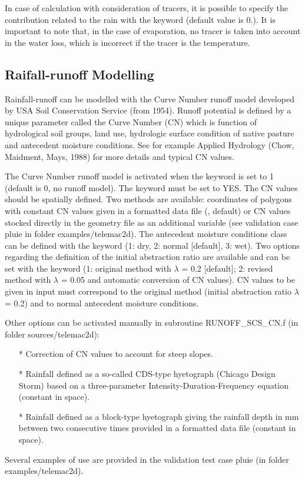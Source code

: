  In case of calculation with consideration of tracers, it is possible to specify the contribution related to the rain with the keyword  (default value is 0.). It is important to note that, in the case of evaporation, no tracer is taken into account in the water loss, which is incorrect if the tracer is the temperature.

\subsection{Raifall-runoff Modelling}

Rainfall-runoff can be modelled with the Curve Number runoff model developed by USA Soil Conservation Service (from 1954). Runoff potential is defined by a unique parameter called the Curve Number (CN) which is function of hydrological soil groups, land use, hydrologic surface condition of native pasture and antecedent moisture conditions. See for example Applied Hydrology (Chow, Maidment, Mays, 1988) for more details and typical CN values. 

The Curve Number runoff model is activated when the keyword  is set to 1 (default is 0, no runoff model). The keyword  
must be set to YES. The CN values should be spatially defined. Two methods are available: coordinates of polygons with constant CN values given in a formatted data file (, default) or CN values stocked directly in the geometry file as an additional variable (see validation case pluie in folder examples/telemac2d). The antecedent moisture conditions class can be defined with the keyword  (1: dry, 2: normal [default], 3: wet). Two options regarding the definition of the initial abstraction ratio are available and can be set with the keyword  (1: original method with $\lambda$ = 0.2 [default]; 2: revised method with $\lambda$ = 0.05 and automatic conversion of CN values). CN values to be given in input must correspond to the original method (initial abstraction ratio $\lambda$ = 0.2) and to normal antecedent moisture conditions.

Other options can be activated manually in subroutine RUNOFF\_SCS\_CN.f (in folder sources/telemac2d):
\begin{itemize}
\item[*] Correction of CN values to account for steep slopes.
\item[*] Rainfall defined as a so-called CDS-type hyetograph (Chicago Design Storm) based on a three-parameter Intensity-Duration-Frequency equation (constant in space).
\item[*] Rainfall defined as a block-type hyetograph giving the rainfall depth in mm between two consecutive times provided in a formatted data file (constant in space).
\end{itemize}
Several examples of use are provided in the validation test case pluie (in folder examples/telemac2d).

